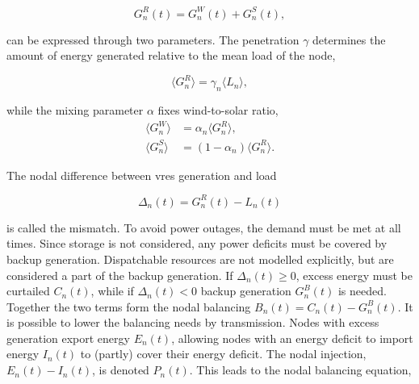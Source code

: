 \documentclass[a4paper, 5p, sort&compress]{elsarticle}%
\newcommand{\mean}[1]{\langle #1 \rangle}
\newcommand{\paren}[1]{\left(#1\right)}
\begin{document}
\begin{equation}
  G^{R}_{n}(t) = G_{n}^{W}(t) + G_{n}^{S}(t),
\end{equation}

can be expressed through two parameters. The penetration $\gamma$
determines the amount of energy generated relative to the mean load of
the node,

\begin{equation}
  \mean{G^{R}_{n}} = \gamma_{n} \mean{L_{n}} ,
\end{equation}

while the mixing parameter $\alpha$ fixes wind-to-solar ratio,
\begin{align}
  \mean{G^{W}_{n}} &=  \alpha_{n} \mean{G_{n}^{R}}  , \\
  \mean{G^{S}_{n}} &=  \paren{1- \alpha_{n}} \mean{G_{n}^{R}}  .
\end{align}

The nodal difference between \gls{vres} generation and load

\begin{equation}
  \Delta_{n}(t) = G^{R}_{n}(t) - L_{n}(t)
\end{equation}

is called the mismatch. To avoid power outages, the demand must be
met at all times. Since storage is not considered, any power
deficits must be covered by backup generation. Dispatchable
resources are not modelled explicitly, but are considered a part of
the backup generation. If $\Delta_{n}(t) \geq 0$, excess energy must be
curtailed $C_{n}(t)$, while if $\Delta_{n}(t) < 0$ backup generation
$G^{B}_{n}(t)$ is needed.
Together the two terms form the nodal balancing
$B_{n}(t) = C_{n}(t) - G^{B}_{n}(t)$.
%
It is possible to lower the balancing needs by transmission. Nodes
with excess generation export energy $E_{n}(t)$, allowing nodes with
an energy deficit to import energy $I_{n}(t)$ to (partly) cover their
energy deficit. The nodal injection, $E_{n}(t) - I_{n}(t)$, is denoted
$P_{n}(t)$. This leads to the nodal balancing equation,
\end{document}
